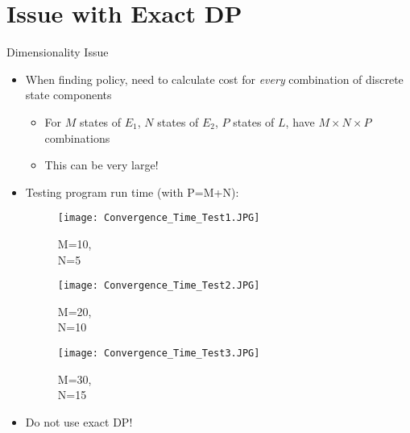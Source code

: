 \documentclass{beamer}
\begin{document}
\section{Issue with Exact DP}
\begin{frame}{Dimensionality Issue}
\begin{itemize}
\item When finding policy, need to calculate cost for \textit{every} combination of discrete state components
\begin{itemize}
\item For $M$ states of $E_{1}$, $N$ states of $E_{2}$, $P$ states of $L$, have $M \times N \times P$ combinations
\item This can be very large!
\end{itemize}
\item Testing program run time (with P=M+N):

\begin{minipage}{0.3\textwidth}
\begin{figure}
\texttt{[image: Convergence\_Time\_Test1.JPG]}
\caption{M=10,\\N=5}
\end{figure}
\end{minipage}
\begin{minipage}{0.3\textwidth}
\begin{figure}
\texttt{[image: Convergence\_Time\_Test2.JPG]}
\caption{M=20,\\N=10}
\end{figure}
\end{minipage}
\begin{minipage}{0.3\textwidth}
\begin{figure}
\texttt{[image: Convergence\_Time\_Test3.JPG]}
\caption{M=30,\\N=15}
\end{figure}
\end{minipage}

\item Do not use exact DP!
\end{itemize}
\end{frame}
\end{document}
